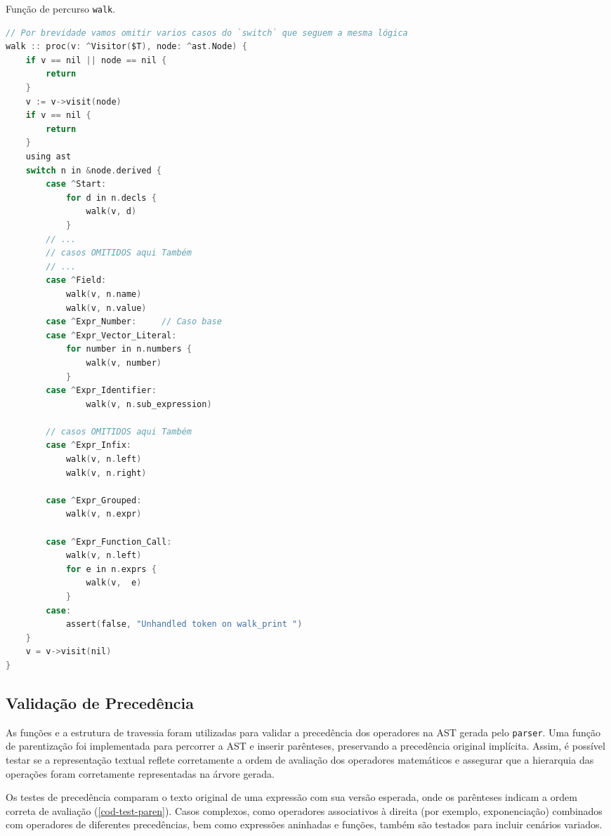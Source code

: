 \begin{codigo}[htb]
\caption{\small Função de percurso \texttt{walk}. }
        \label{cod-visitor-walk}
\begin{lstlisting}[language = C, basicstyle=\ttfamily\footnotesize]
// Por brevidade vamos omitir varios casos do `switch` que seguem a mesma lógica
walk :: proc(v: ^Visitor($T), node: ^ast.Node) {
    if v == nil || node == nil {
        return
    }
    v := v->visit(node)
    if v == nil {
        return
    }
    using ast
    switch n in &node.derived {
        case ^Start:
            for d in n.decls {
                walk(v, d)
            }
        // ...
        // casos OMITIDOS aqui Também
        // ...
        case ^Field:
            walk(v, n.name)
            walk(v, n.value)
        case ^Expr_Number:     // Caso base
        case ^Expr_Vector_Literal:
            for number in n.numbers {
                walk(v, number)
            }
        case ^Expr_Identifier:
                walk(v, n.sub_expression)

        // casos OMITIDOS aqui Também
        case ^Expr_Infix:
            walk(v, n.left)
            walk(v, n.right)

        case ^Expr_Grouped:
            walk(v, n.expr)

        case ^Expr_Function_Call:
            walk(v, n.left)
            for e in n.exprs {
                walk(v,  e)
            }
        case:
            assert(false, "Unhandled token on walk_print ")
    }
    v = v->visit(nil)
}

  \end{lstlisting}
\end{codigo}


\subsection{Validação de Precedência}
As funções e a estrutura de travessia foram utilizadas para validar a precedência dos operadores na AST gerada pelo \texttt{parser}. Uma função de parentização foi implementada para percorrer a AST e inserir parênteses, preservando a precedência original implícita. Assim, é possível testar se a representação textual reflete corretamente a ordem de avaliação dos operadores matemáticos e assegurar que a hierarquia das operações foram corretamente representadas na árvore gerada.

Os testes de precedência comparam o texto original de uma expressão com sua versão esperada, onde os parênteses indicam a ordem correta de avaliação (\autoref{cod-test-paren}). Casos complexos, como operadores associativos à direita (por exemplo, exponenciação) combinados com operadores de diferentes precedências, bem como expressões aninhadas e funções, também são testados para incluir cenários variados.


